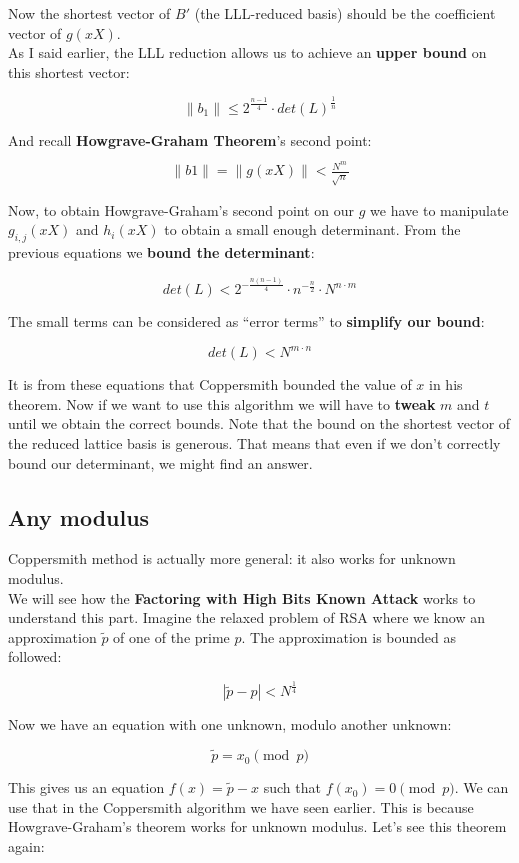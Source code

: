 \documentclass[a4paper,11pt]{article}
\begin{document}
Now the shortest vector of $B'$ (the LLL-reduced basis) should be the coefficient vector of $g(xX)$. \\

As I said earlier, the LLL reduction allows us to achieve an \textbf{upper bound} on this shortest vector:

\[ \|b_1\| \leq 2^{\frac{n-1}{4}} \cdot det(L)^{\frac{1}{n}} \]

And recall \textbf{Howgrave-Graham Theorem}'s second point:

\[ \|b1\| = \|g(xX)\| < \frac{_{N^m}}{^{\sqrt{n}}} \]

Now, to obtain Howgrave-Graham's second point on our $g$ we have to manipulate $g_{i,j}(xX)$ and $h_i(xX)$ to obtain a small enough determinant. From the previous equations we \textbf{bound the determinant}:

\[ det(L) < 2^{-\frac{n(n-1)}{4}} \cdot n^{-\frac{n}{2}} \cdot N^{n \cdot m} \]

The small terms can be considered as ``error terms'' to \textbf{simplify our bound}:

\[ det(L) < N^{m \cdot n}\]

It is from these equations that Coppersmith bounded the value of $x$ in his theorem. Now if we want to use this algorithm we will have to \textbf{tweak} $m$ and $t$ until we obtain the correct bounds. Note that the bound on the shortest vector of the reduced lattice basis is generous. That means that even if we don't correctly bound our determinant, we might find an answer.

\subsection{Any modulus}\label{anymodulus}

Coppersmith method is actually more general: it also works for unknown modulus.\\
We will see how the \textbf{Factoring with High Bits Known Attack} works to understand this part. Imagine the relaxed problem of RSA where we know an approximation $\tilde{p}$ of one of the prime $p$. The approximation is bounded as followed:

\[ |\tilde{p} - p| < N^{\frac{1}{4}} \]

Now we have an equation with one unknown, modulo another unknown:

\[ \tilde{p} = x_0 \pmod{p} \]

This gives us an equation $f(x) = \tilde{p} - x$ such that $f(x_0) = 0 \pmod{p}$. We can use that in the Coppersmith algorithm we have seen earlier. This is because Howgrave-Graham's theorem works for unknown modulus. Let's see this theorem again:
\end{document}
